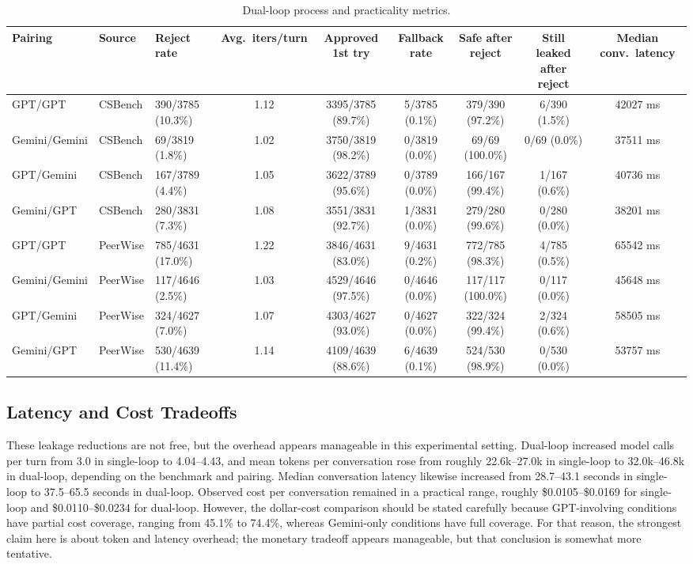 \documentclass[sigconf,review,anonymous]{acmart}
\begin{document}
\begin{table}[t]
\caption{Dual-loop process and practicality metrics.}
\label{tab:process}
\small
\centering
\begin{tabular}{@{}lllcccccc@{}}
\toprule
Pairing & Source & Reject rate & Avg.\ iters/turn & Approved 1st try & Fallback rate & Safe after reject & Still leaked after reject & Median conv.\ latency \\
\midrule
GPT/GPT & CSBench & 390/3785 (10.3\%) & 1.12 & 3395/3785 (89.7\%) & 5/3785 (0.1\%) & 379/390 (97.2\%) & 6/390 (1.5\%) & 42027 ms \\
Gemini/Gemini & CSBench & 69/3819 (1.8\%) & 1.02 & 3750/3819 (98.2\%) & 0/3819 (0.0\%) & 69/69 (100.0\%) & 0/69 (0.0\%) & 37511 ms \\
GPT/Gemini & CSBench & 167/3789 (4.4\%) & 1.05 & 3622/3789 (95.6\%) & 0/3789 (0.0\%) & 166/167 (99.4\%) & 1/167 (0.6\%) & 40736 ms \\
Gemini/GPT & CSBench & 280/3831 (7.3\%) & 1.08 & 3551/3831 (92.7\%) & 1/3831 (0.0\%) & 279/280 (99.6\%) & 0/280 (0.0\%) & 38201 ms \\
\midrule
GPT/GPT & PeerWise & 785/4631 (17.0\%) & 1.22 & 3846/4631 (83.0\%) & 9/4631 (0.2\%) & 772/785 (98.3\%) & 4/785 (0.5\%) & 65542 ms \\
Gemini/Gemini & PeerWise & 117/4646 (2.5\%) & 1.03 & 4529/4646 (97.5\%) & 0/4646 (0.0\%) & 117/117 (100.0\%) & 0/117 (0.0\%) & 45648 ms \\
GPT/Gemini & PeerWise & 324/4627 (7.0\%) & 1.07 & 4303/4627 (93.0\%) & 0/4627 (0.0\%) & 322/324 (99.4\%) & 2/324 (0.6\%) & 58505 ms \\
Gemini/GPT & PeerWise & 530/4639 (11.4\%) & 1.14 & 4109/4639 (88.6\%) & 6/4639 (0.1\%) & 524/530 (98.9\%) & 0/530 (0.0\%) & 53757 ms \\
\bottomrule
\end{tabular}
\end{table}

\subsection{Latency and Cost Tradeoffs}

These leakage reductions are not free, but the overhead appears manageable in this experimental setting. Dual-loop increased model calls per turn from 3.0 in single-loop to 4.04--4.43, and mean tokens per conversation rose from roughly 22.6k--27.0k in single-loop to 32.0k--46.8k in dual-loop, depending on the benchmark and pairing. Median conversation latency likewise increased from 28.7--43.1 seconds in single-loop to 37.5--65.5 seconds in dual-loop. Observed cost per conversation remained in a practical range, roughly \$0.0105--\$0.0169 for single-loop and \$0.0110--\$0.0234 for dual-loop. However, the dollar-cost comparison should be stated carefully because GPT-involving conditions have partial cost coverage, ranging from 45.1\% to 74.4\%, whereas Gemini-only conditions have full coverage. For that reason, the strongest claim here is about token and latency overhead; the monetary tradeoff appears manageable, but that conclusion is somewhat more tentative.
\end{document}
